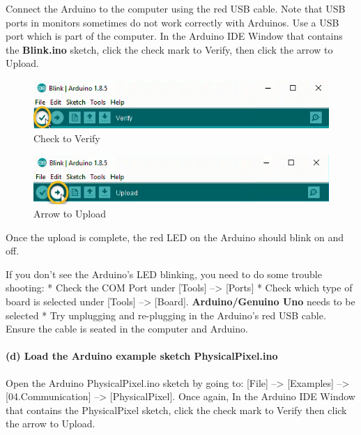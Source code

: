 \documentclass[11pt]{article}
\makeatletter
\def\maxwidth{\ifdim\Gin@nat@width>\linewidth\linewidth
    \else\Gin@nat@width\fi}
\let\Oldincludegraphics\includegraphics
\renewcommand{\includegraphics}[1]{\Oldincludegraphics[width=.8\maxwidth]{#1}}
\makeatother
\begin{document}
Connect the Arduino to the computer using the red USB cable. Note that
USB ports in monitors sometimes do not work correctly with Arduinos. Use
a USB port which is part of the computer. In the Arduino IDE Window that
contains the \textbf{Blink.ino} sketch, click the check mark to Verify,
then click the arrow to Upload.

\begin{figure}
\centering
\includegraphics{images/Check_to_Verify.png}
\caption{Check to Verify}
\end{figure}

\begin{figure}
\centering
\includegraphics{images/Arrow_to_Upload.png}
\caption{Arrow to Upload}
\end{figure}

Once the upload is complete, the red LED on the Arduino should blink on
and off.

If you don't see the Arduino's LED blinking, you need to do some trouble
shooting: * Check the COM Port under {[}Tools{]} --\textgreater{}
{[}Ports{]} * Check which type of board is selected under {[}Tools{]}
--\textgreater{} {[}Board{]}. \textbf{Arduino/Genuino Uno} needs to be
selected * Try unplugging and re-plugging in the Arduino's red USB
cable. Ensure the cable is seated in the computer and Arduino.

    \hypertarget{d-load-the-arduino-example-sketch-physicalpixel.ino}{%
\paragraph{(d) Load the Arduino example sketch
PhysicalPixel.ino}\label{d-load-the-arduino-example-sketch-physicalpixel.ino}}

Open the Arduino PhysicalPixel.ino sketch by going to: {[}File{]}
--\textgreater{} {[}Examples{]} --\textgreater{} {[}04.Communication{]}
--\textgreater{} {[}PhysicalPixel{]}. Once again, In the Arduino IDE
Window that contains the PhysicalPixel sketch, click the check mark to
Verify then click the arrow to Upload.
\end{document}
